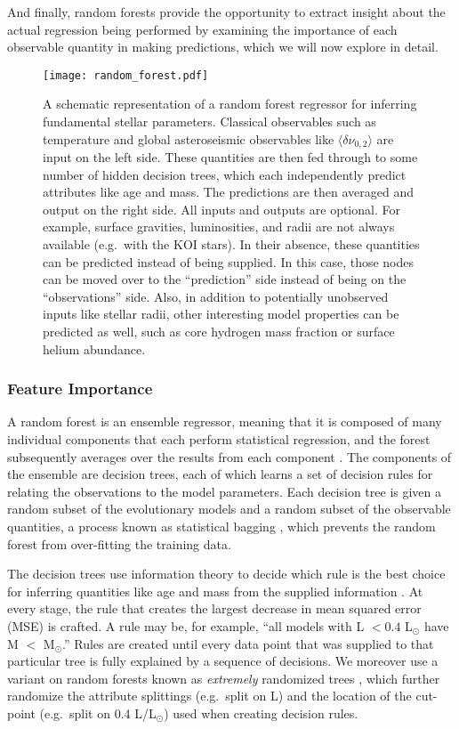 \documentclass[manuscript,linenumbers]{aastex6}
\begin{document}
And finally, random forests provide the opportunity to extract insight about the actual regression being performed by examining the importance of each observable quantity in making predictions, which we will now explore in detail. 

\begin{figure*}[ht]
    \centering
    \texttt{[image: random\_forest.pdf]}
    \caption{A schematic representation of a random forest regressor for inferring fundamental stellar parameters. Classical observables such as temperature and global asteroseismic observables like $\langle\delta\nu_{0,2}\rangle$ are input on the left side. These quantities are then fed through to some number of hidden decision trees, which each independently predict attributes like age and mass. The predictions are then averaged and output on the right side. All inputs and outputs are optional. For example, surface gravities, luminosities, and radii are not always available (e.g.\ with the KOI stars). In their absence, these quantities can be predicted instead of being supplied. In this case, those nodes can be moved over to the ``prediction'' side instead of being on the ``observations'' side. Also, in addition to potentially unobserved inputs like stellar radii, other interesting model properties can be predicted as well, such as core hydrogen mass fraction or surface helium abundance. \label{fig:rf} }
\end{figure*}


\subsubsection{Feature Importance} \label{sec:importances}
A random forest is an ensemble regressor, meaning that it is composed of many individual components that each perform statistical regression, and the forest subsequently averages over the results from each component \citep{breiman2001random}. The components of the ensemble are decision trees, each of which learns a set of decision rules for relating the observations to the model parameters. Each decision tree is given a random subset of the evolutionary models and a random subset of the observable quantities, a process known as statistical bagging \citep[][Section 8.7]{hastie2005elements}, which prevents the random forest from over-fitting the training data. 

The decision trees use information theory to decide which rule is the best choice for inferring quantities like age and mass from the supplied information \citep[][Chapter 9]{hastie2005elements}. At every stage, the rule that creates the largest decrease in mean squared error (MSE) is crafted. A rule may be, for example, ``all models with L $<0.4$ L$_\odot$ have M $<$ M$_\odot$.'' Rules are created until every data point that was supplied to that particular tree is fully explained by a sequence of decisions. We moreover use a variant on random forests known as \emph{extremely} randomized trees \citep{geurts2006extremely}, which further randomize the attribute splittings (e.g.\ split on L) and the location of the cut-point (e.g.\ split on 0.4 L/L$_\odot$) used when creating decision rules. 
\end{document}
